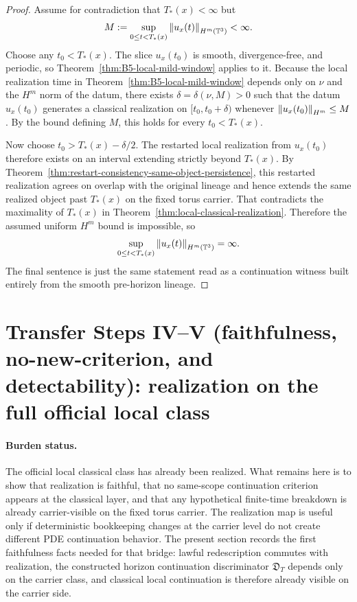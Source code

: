 \begin{proof}
Assume for contradiction that $T_*(x)<\infty$ but
\[
M:=\sup_{0\le t<T_*(x)} \left\lVert u_x(t)\right\rVert_{H^m(\mathbb{T}^3)}<\infty.
\]
Choose any $t_0<T_*(x)$. The slice $u_x(t_0)$ is smooth, divergence-free, and periodic, so Theorem~\ref{thm:B5-local-mild-window} applies to it. Because the local realization time in Theorem~\ref{thm:B5-local-mild-window} depends only on $\nu$ and the $H^m$ norm of the datum, there exists $\delta=\delta(\nu,M)>0$ such that the datum $u_x(t_0)$ generates a classical realization on $[t_0,t_0+\delta)$ whenever $\left\lVert u_x(t_0)\right\rVert_{H^m}\le M$. By the bound defining $M$, this holds for every $t_0<T_*(x)$.

Now choose $t_0>T_*(x)-\delta/2$. The restarted local realization from $u_x(t_0)$ therefore exists on an interval extending strictly beyond $T_*(x)$. By Theorem~\ref{thm:restart-consistency-same-object-persistence}, this restarted realization agrees on overlap with the original lineage and hence extends the same realized object past $T_*(x)$ on the fixed torus carrier. That contradicts the maximality of $T_*(x)$ in Theorem~\ref{thm:local-classical-realization}. Therefore the assumed uniform $H^m$ bound is impossible, so
\[
\sup_{0\le t<T_*(x)} \left\lVert u_x(t)\right\rVert_{H^m(\mathbb{T}^3)}=\infty.
\]
The final sentence is just the same statement read as a continuation witness built entirely from the smooth pre-horizon lineage.
\end{proof}

\section{Transfer Steps IV--V (faithfulness, no-new-criterion, and detectability): realization on the full official local class}\label{sec:faithfulness-full-class}
\paragraph{Burden status.}
The official local classical class has already been realized. What remains here is to show that realization is faithful, that no same-scope continuation criterion appears at the classical layer, and that any hypothetical finite-time breakdown is already carrier-visible on the fixed torus carrier.
The realization map is useful only if deterministic bookkeeping changes at the carrier level do
not create different PDE continuation behavior. The present section records the first faithfulness
facts needed for that bridge: lawful redescription commutes with realization, the constructed horizon
continuation discriminator $\mathfrak D_T$ depends only on the carrier class, and classical local
continuation is therefore already visible on the carrier side.

